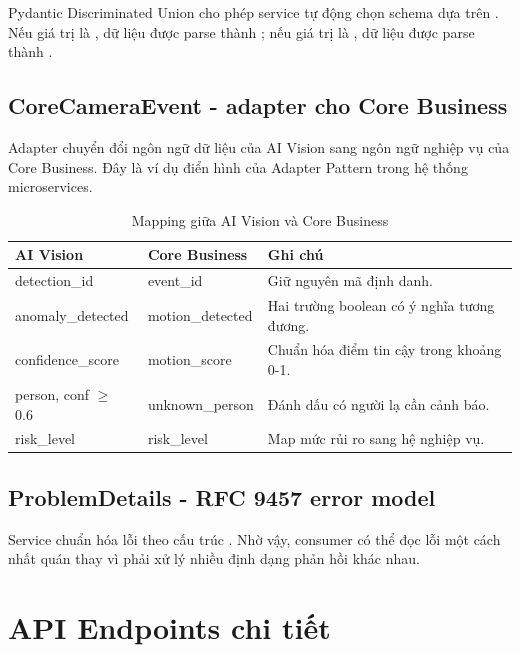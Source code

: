Pydantic Discriminated Union cho phép service tự động chọn schema dựa trên . Nếu giá trị là , dữ liệu được parse thành ; nếu giá trị là , dữ liệu được parse thành .

\subsection{CoreCameraEvent - adapter cho Core Business}

Adapter chuyển đổi ngôn ngữ dữ liệu của AI Vision sang ngôn ngữ nghiệp vụ của Core Business. Đây là ví dụ điển hình của Adapter Pattern trong hệ thống microservices.

\begin{table}[H]
\centering
\caption{Mapping giữa AI Vision và Core Business}
\label{tab:mapping-core}
\ReportTableFont
\begin{tabular}{|>{\raggedright\arraybackslash}p{3.6cm}|>{\raggedright\arraybackslash}p{3.6cm}|>{\raggedright\arraybackslash}p{6.1cm}|}
\hline
\textbf{AI Vision} & \textbf{Core Business} & \textbf{Ghi chú} \\
\hline
detection\_id & event\_id & Giữ nguyên mã định danh. \\
\hline
anomaly\_detected & motion\_detected & Hai trường boolean có ý nghĩa tương đương. \\
\hline
confidence\_score & motion\_score & Chuẩn hóa điểm tin cậy trong khoảng 0-1. \\
\hline
person, conf $\geq$ 0.6 & unknown\_person & Đánh dấu có người lạ cần cảnh báo. \\
\hline
risk\_level & risk\_level & Map mức rủi ro sang hệ nghiệp vụ. \\
\hline
\end{tabular}
\normalsize
{}
\end{table}

\subsection{ProblemDetails - RFC 9457 error model}

Service chuẩn hóa lỗi theo cấu trúc . Nhờ vậy, consumer có thể đọc lỗi một cách nhất quán thay vì phải xử lý nhiều định dạng phản hồi khác nhau.

\section{API Endpoints chi tiết}

